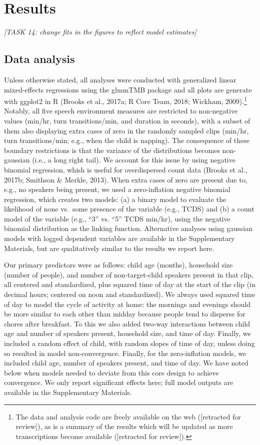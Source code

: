 \documentclass[floatsintext,man]{apa6}
\theoremstyle{definition}
\theoremstyle{definition}
\theoremstyle{definition}
\theoremstyle{remark}
\begin{document}
\section{Results}\label{results}

\emph{{[}TASK 14: change fits in the figures to reflect model
estimates{]}}

\subsection{Data analysis}\label{data-analysis}

Unless otherwise stated, all analyses were conducted with generalized
linear mixed-effects regressions using the glmmTMB package and all plots
are generate with ggplot2 in R (Brooks et al., 2017a; R Core Team, 2018;
Wickham, 2009).\footnote{The data and analysis code are freely available
  on the web ({[}retracted for review{]}), as is a summary of the
  results which will be updated as more transcriptions become available
  ({[}retracted for review{]}).} Notably, all five speech environment
measures are restricted to non-negative values (min/hr, turn
transitions/min, and duration in seconds), with a subset of them also
displaying extra cases of zero in the randomly sampled clips (min/hr,
turn transitions/min; e.g., when the child is napping). The consequence
of these boundary restrictions is that the variance of the distributions
becomes non-gaussian (i.e., a long right tail). We account for this
issue by using negative binomial regression, whish is useful for
overdispersed count data (Brooks et al., 2017b; Smithson \& Merkle,
2013). When extra cases of zero are present due to, e.g., no speakers
being present, we used a zero-inflation negative binomial regression,
which creates two models: (a) a binary model to evaluate the likelihood
of none vs.~some presence of the variable (e.g., TCDS) and (b) a count
model of the variable (e.g., \enquote{3} vs. \enquote{5} TCDS min/hr),
using the negative binomial distribution as the linking function.
Alternative analyses using gaussian models with logged dependent
variables are available in the Supplementary Materials, but are
qualitatively similar to the results we report here.

Our primary predictors were as follows: child age (months), household
size (number of people), and number of non-target-child speakers present
in that clip, all centered and standardized, plus squared time of day at
the start of the clip (in decimal hours; centered on noon and
standardized). We always used squared time of day to model the cycle of
activity at home: the mornings and evenings should be more similar to
each other than midday because people tend to disperse for chores after
breakfast. To this we also added two-way interactions between child age
and number of speakers present, household size, and time of day.
Finally, we included a random effect of child, with random slopes of
time of day, unless doing so resulted in model non-convergence. Finally,
for the zero-inflation models, we included child age, number of speakers
present, and time of day. We have noted below when models needed to
deviate from this core design to achieve convergence. We only report
significant effects here; full model outputs are available in the
Supplementary Materials.
\end{document}
